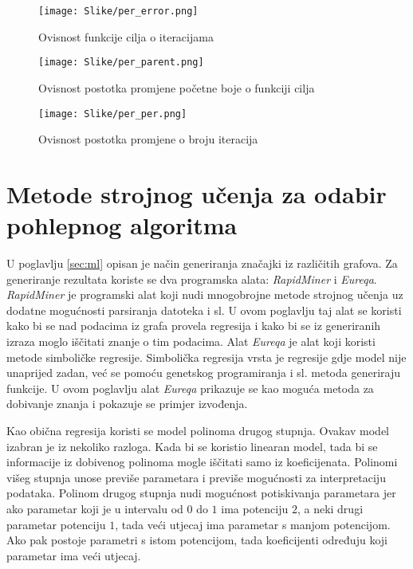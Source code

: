 \documentclass[times, utf8, diplomski, numeric]{fer}
\begin{document}
\begin{figure}[htb]
	\texttt{[image: Slike/per\_error.png]}
  \caption{Ovisnost funkcije cilja o iteracijama}
  \label{fig:per_error}
\end{figure}

\begin{figure}[htb]
	\texttt{[image: Slike/per\_parent.png]}
  \caption{Ovisnost postotka promjene početne boje o funkciji cilja}
	\label{fig:per_parent}
\end{figure}

\begin{figure}[htb]
	\texttt{[image: Slike/per\_per.png]}
	\caption{Ovisnost postotka promjene o broju iteracija}
	\label{fig:per_per}
\end{figure}


\section{Metode strojnog učenja za odabir pohlepnog algoritma}

U poglavlju \ref{sec:ml} opisan je način generiranja značajki iz različitih grafova. Za generiranje rezultata koriste se dva programska alata: \emph{RapidMiner} i \emph{Eureqa}. \emph{RapidMiner} je programski alat koji nudi mnogobrojne metode strojnog učenja uz dodatne mogućnosti parsiranja datoteka i sl. U ovom poglavlju taj alat se koristi kako bi se nad podacima iz grafa provela regresija i kako bi se iz generiranih izraza moglo iščitati znanje o tim podacima. Alat \emph{Eureqa} je alat koji koristi metode simboličke regresije. Simbolička regresija vrsta je regresije gdje model nije unaprijed zadan, već se pomoću genetskog programiranja i sl. metoda generiraju funkcije. U ovom poglavlju alat \emph{Eureqa} prikazuje se kao moguća metoda za dobivanje znanja i pokazuje se primjer izvođenja.

Kao obična regresija koristi se model polinoma drugog stupnja. Ovakav model izabran je iz nekoliko razloga. Kada bi se koristio linearan model, tada bi se informacije iz dobivenog polinoma mogle iščitati samo iz koeficijenata. Polinomi višeg stupnja unose previše parametara i previše mogućnosti za interpretaciju podataka. Polinom drugog stupnja nudi mogućnost potiskivanja parametara jer ako parametar koji je u intervalu od $0$ do $1$ ima potenciju $2$, a neki drugi parametar potenciju $1$, tada veći utjecaj ima parametar s manjom potencijom. Ako pak postoje parametri s istom potencijom, tada koeficijenti određuju koji parametar ima veći utjecaj.
\end{document}

